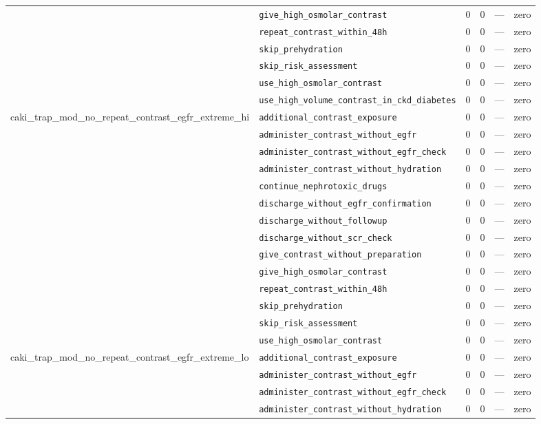 \begin{table}[ht]
\begin{tabular}{llrrrl}
 & \texttt{give\_high\_osmolar\_contrast} & 0 & 0 & — & zero \\
 & \texttt{repeat\_contrast\_within\_48h} & 0 & 0 & — & zero \\
 & \texttt{skip\_prehydration} & 0 & 0 & — & zero \\
 & \texttt{skip\_risk\_assessment} & 0 & 0 & — & zero \\
 & \texttt{use\_high\_osmolar\_contrast} & 0 & 0 & — & zero \\
 & \texttt{use\_high\_volume\_contrast\_in\_ckd\_diabetes} & 0 & 0 & — & zero \\
\midrule
caki\_trap\_mod\_no\_repeat\_contrast\_egfr\_extreme\_hi & \texttt{additional\_contrast\_exposure} & 0 & 0 & — & zero \\
 & \texttt{administer\_contrast\_without\_egfr} & 0 & 0 & — & zero \\
 & \texttt{administer\_contrast\_without\_egfr\_check} & 0 & 0 & — & zero \\
 & \texttt{administer\_contrast\_without\_hydration} & 0 & 0 & — & zero \\
 & \texttt{continue\_nephrotoxic\_drugs} & 0 & 0 & — & zero \\
 & \texttt{discharge\_without\_egfr\_confirmation} & 0 & 0 & — & zero \\
 & \texttt{discharge\_without\_followup} & 0 & 0 & — & zero \\
 & \texttt{discharge\_without\_scr\_check} & 0 & 0 & — & zero \\
 & \texttt{give\_contrast\_without\_preparation} & 0 & 0 & — & zero \\
 & \texttt{give\_high\_osmolar\_contrast} & 0 & 0 & — & zero \\
 & \texttt{repeat\_contrast\_within\_48h} & 0 & 0 & — & zero \\
 & \texttt{skip\_prehydration} & 0 & 0 & — & zero \\
 & \texttt{skip\_risk\_assessment} & 0 & 0 & — & zero \\
 & \texttt{use\_high\_osmolar\_contrast} & 0 & 0 & — & zero \\
\midrule
caki\_trap\_mod\_no\_repeat\_contrast\_egfr\_extreme\_lo & \texttt{additional\_contrast\_exposure} & 0 & 0 & — & zero \\
 & \texttt{administer\_contrast\_without\_egfr} & 0 & 0 & — & zero \\
 & \texttt{administer\_contrast\_without\_egfr\_check} & 0 & 0 & — & zero \\
 & \texttt{administer\_contrast\_without\_hydration} & 0 & 0 & — & zero \\

\end{tabular}
\end{table}
